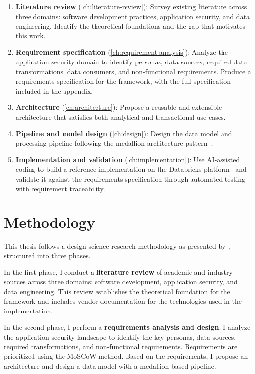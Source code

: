 \begin{enumerate}
    \item \textbf{Literature review} (\autoref{ch:literature-review}): Survey existing literature across three domains: software development practices, application security, and data engineering. Identify the theoretical foundations and the gap that motivates this work.
    \item \textbf{Requirement specification} (\autoref{ch:requirement-analysis}): Analyze the application security domain to identify personas, data sources, required data transformations, data consumers, and non-functional requirements. Produce a requirements specification for the framework, with the full specification included in the appendix.
    \item \textbf{Architecture} (\autoref{ch:architecture}): Propose a reusable and extensible architecture that satisfies both analytical and transactional use cases.
    \item \textbf{Pipeline and model design} (\autoref{ch:design}): Design the data model and processing pipeline following the medallion architecture pattern~\cite{Strengholt2025}.
    \item \textbf{Implementation and validation} (\autoref{ch:implementation}): Use AI-assisted coding to build a reference implementation on the Databricks platform~\cite{Lee2024} and validate it against the requirements specification through automated testing with requirement traceability.
\end{enumerate}

\section*{Methodology}

This thesis follows a design-science research methodology as presented by~\textcite{Hevner2004, Peffers2007}, structured into three phases.

In the first phase, I conduct a \textbf{literature review} of academic and industry sources across three domains: software development, application security, and data engineering. This review establishes the theoretical foundation for the framework and includes vendor documentation for the technologies used in the implementation.

In the second phase, I perform a \textbf{requirements analysis and design}. I analyze the application security landscape to identify the key personas, data sources, required transformations, and non-functional requirements. Requirements are prioritized using the MoSCoW method. Based on the requirements, I propose an architecture and design a data model with a medallion-based pipeline.

